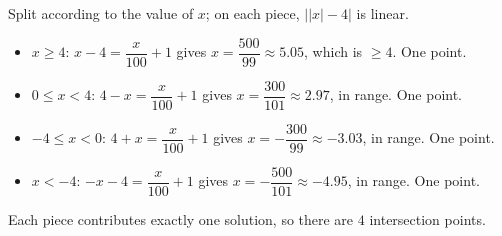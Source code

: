Split according to the value of $x$; on each piece, $\big||x|-4\big|$ is linear.
\begin{itemize}
\item $x\ge4$: $x-4=\dfrac{x}{100}+1$ gives $x=\dfrac{500}{99}\approx5.05$, which is $\ge4$. One point.
\item $0\le x<4$: $4-x=\dfrac{x}{100}+1$ gives $x=\dfrac{300}{101}\approx2.97$, in range. One point.
\item $-4\le x<0$: $4+x=\dfrac{x}{100}+1$ gives $x=-\dfrac{300}{99}\approx-3.03$, in range. One point.
\item $x<-4$: $-x-4=\dfrac{x}{100}+1$ gives $x=-\dfrac{500}{101}\approx-4.95$, in range. One point.
\end{itemize}
Each piece contributes exactly one solution, so there are $\boxed{4}$ intersection points.

